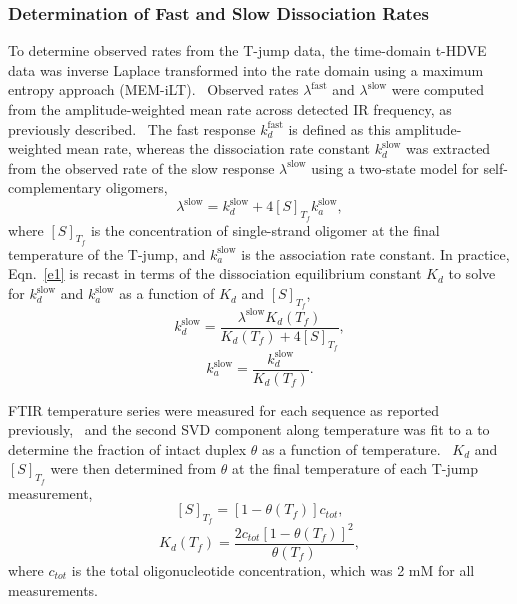 \documentclass[journal=jpcbfk,manuscript=article]{achemso}
\newcommand*{\rood}[1]{{\color{red}{#1}}}
\begin{document}
\subsubsection{Determination of Fast and Slow Dissociation Rates}\label{sec:TjumpAnalysis}

To determine observed rates from the T-jump data, the time-domain t-HDVE data was inverse Laplace transformed into the rate domain using a maximum entropy approach (MEM-iLT).~\citep{Kumar2001OnTimescales} Observed rates $\lambda^\mathrm{fast}$ and $\lambda^\mathrm{slow}$ were computed from the amplitude-weighted mean rate across detected IR frequency, as previously described.~\citep{Sanstead2018DirectDehybridization} The fast response $k_d^\mathrm{fast}$ is defined as this amplitude-weighted mean rate, whereas the dissociation rate constant $k_d^\mathrm{slow}$ was extracted from the observed rate of the slow response $\lambda^\mathrm{slow}$ using a two-state model for self-complementary oligomers,~\citep{Bernasconi2012RelaxationKinetics}
	\begin{equation}\label{e1}
	\lambda^\mathrm{slow} = k_d^\mathrm{slow} + 4[S]_{T_f}k_a^\mathrm{slow},
	\end{equation}
where $[S]_{T_f}$ is the concentration of single-strand oligomer at the final temperature of the T-jump, and $k_a^\mathrm{slow}$ is the association rate constant. In practice, Eqn.~\ref{e1} is recast in terms of the dissociation equilibrium constant $K_d$ to solve for $k_d^\mathrm{slow}$ and $k_a^\mathrm{slow}$ as a function of $K_d$ and $[S]_{T_f}$,
	\begin{equation}\label{e2a}
	k_d^\mathrm{slow} = \frac{\lambda^\mathrm{slow}K_d(T_f)}{K_d(T_f)+4[S]_{T_f}},
	\end{equation}
	\begin{equation}\label{e2b}
	k_a^\mathrm{slow} = \frac{k_d^\mathrm{slow}}{K_d(T_f)}.
	\end{equation}

FTIR temperature series were measured for each sequence as reported previously,~\citep{Sanstead2016} and the second SVD component along temperature was fit to a \rood{two-state model} to determine the fraction of intact duplex $\theta$ as a function of temperature.~\citep{Marky1987CalculatingCurves} $K_d$ and $[S]_{T_f}$ were then determined from $\theta$ at the final temperature of each T-jump measurement,
	\begin{equation}\label{e3a}
	[S]_{T_f} = [1 - \theta(T_f)]c_{tot},
	\end{equation}
	\begin{equation}\label{e3b}
	K_d(T_f) = \frac{2c_{tot}[1 - \theta(T_f)]^2}{\theta(T_f)},
	\end{equation}
where $c_{tot}$ is the total oligonucleotide concentration, which was 2 mM for all measurements.
\end{document}
